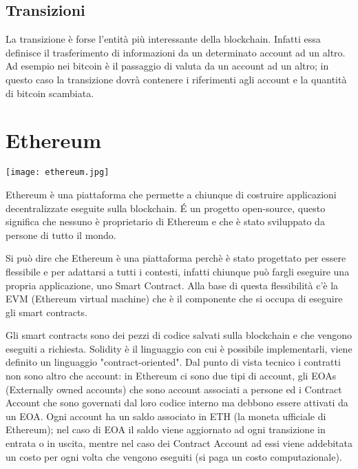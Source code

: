 \subsection{Transizioni}
La transizione è forse l'entità più interessante della blockchain. Infatti essa definisce il trasferimento di informazioni da un determinato account ad un altro. Ad esempio nei bitcoin è il passaggio di valuta da un account ad un altro; in questo caso la transizione dovrà contenere i riferimenti agli account e la quantità di bitcoin scambiata.


\section{Ethereum}

\begin{center}
    \texttt{[image: ethereum.jpg]}
\end{center}

Ethereum è una piattaforma che permette a chiunque di costruire applicazioni decentralizzate eseguite sulla blockchain.
\'E un progetto open-source, questo significa che nessuno è proprietario di Ethereum e che è stato sviluppato da persone di tutto il mondo.

\vspace{0.5cm}

Si può dire che Ethereum è una piattaforma perchè è stato progettato per essere flessibile e per adattarsi a tutti i contesti, infatti chiunque può fargli eseguire una propria applicazione, uno Smart Contract.
Alla base di questa flessibilità c'è la EVM (Ethereum virtual machine) che è il componente che si occupa di eseguire gli smart contracts.

\vspace{0.5cm}

Gli smart contracts sono dei pezzi di codice salvati sulla blockchain e che vengono eseguiti a richiesta.
Solidity è il linguaggio con cui è possibile implementarli, viene definito un linguaggio "contract-oriented".
Dal punto di vista tecnico i contratti non sono altro che account: in Ethereum ci sono due tipi di account, gli EOAs (Externally owned accounts) che sono account associati a persone ed i Contract Account che sono governati dal loro codice interno ma debbono essere attivati da un EOA.
Ogni account ha un saldo associato in ETH (la moneta ufficiale di Ethereum); nel caso di EOA il saldo viene aggiornato ad ogni transizione in entrata o in uscita, mentre nel caso dei Contract Account ad essi viene addebitata un costo per ogni volta che vengono eseguiti (si paga un costo computazionale).

